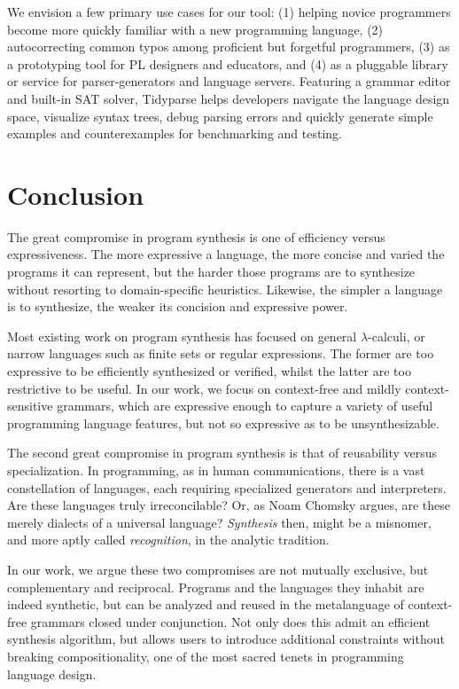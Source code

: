 \documentclass[sigplan,review,anonymous,acmsmall]{acmart}\settopmatter{printfolios=false,printccs=false,printacmref=false}
\begin{document}
  We envision a few primary use cases for our tool: (1) helping novice programmers become more quickly familiar with a new programming language, (2) autocorrecting common typos among proficient but forgetful programmers, (3) as a prototyping tool for PL designers and educators, and (4) as a pluggable library or service for parser-generators and language servers. Featuring a grammar editor and built-in SAT solver, Tidyparse helps developers navigate the language design space, visualize syntax trees, debug parsing errors and quickly generate simple examples and counterexamples for benchmarking and testing.

  \section{Conclusion}\label{sec:conclusion}


  The great compromise in program synthesis is one of efficiency versus expressiveness. The more expressive a language, the more concise and varied the programs it can represent, but the harder those programs are to synthesize without resorting to domain-specific heuristics. Likewise, the simpler a language is to synthesize, the weaker its concision and expressive power.

  Most existing work on program synthesis has focused on general $\lambda$-calculi, or narrow languages such as finite sets or regular expressions. The former are too expressive to be efficiently synthesized or verified, whilst the latter are too restrictive to be useful. In our work, we focus on context-free and mildly context-sensitive grammars, which are expressive enough to capture a variety of useful programming language features, but not so expressive as to be unsynthesizable.

  The second great compromise in program synthesis is that of reusability versus specialization. In programming, as in human communications, there is a vast constellation of languages, each requiring specialized generators and interpreters. Are these languages truly irreconcilable? Or, as Noam Chomsky argues, are these merely dialects of a universal language? \textit{Synthesis} then, might be a misnomer, and more aptly called \textit{recognition}, in the analytic tradition.

  In our work, we argue these two compromises are not mutually exclusive, but complementary and reciprocal. Programs and the languages they inhabit are indeed synthetic, but can be analyzed and reused in the metalanguage of context-free grammars closed under conjunction. Not only does this admit an efficient synthesis algorithm, but allows users to introduce additional constraints without breaking compositionality, one of the most sacred tenets in programming language design.
\end{document}
